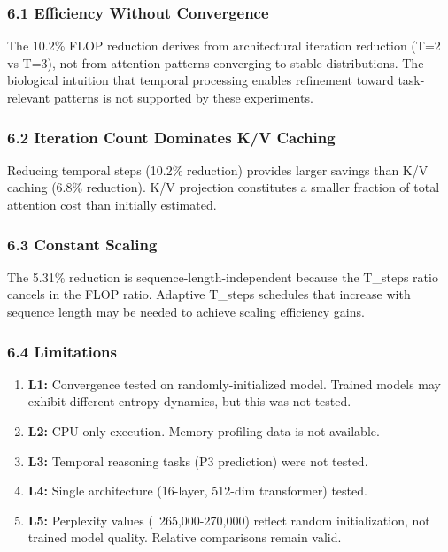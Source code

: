 
\subsubsection{6.1 Efficiency Without Convergence}

The 10.2\% FLOP reduction derives from architectural iteration reduction (T=2 vs T=3), not from attention patterns converging to stable distributions. The biological intuition that temporal processing enables refinement toward task-relevant patterns is not supported by these experiments.

\subsubsection{6.2 Iteration Count Dominates K/V Caching}

Reducing temporal steps (10.2\% reduction) provides larger savings than K/V caching (6.8\% reduction). K/V projection constitutes a smaller fraction of total attention cost than initially estimated.

\subsubsection{6.3 Constant Scaling}

The 5.31\% reduction is sequence-length-independent because the T\_steps ratio cancels in the FLOP ratio. Adaptive T\_steps schedules that increase with sequence length may be needed to achieve scaling efficiency gains.

\subsubsection{6.4 Limitations}

\begin{enumerate}
\item \textbf{L1:} Convergence tested on randomly-initialized model. Trained models may exhibit different entropy dynamics, but this was not tested.
\item \textbf{L2:} CPU-only execution. Memory profiling data is not available.
\item \textbf{L3:} Temporal reasoning tasks (P3 prediction) were not tested.
\item \textbf{L4:} Single architecture (16-layer, 512-dim transformer) tested.
\item \textbf{L5:} Perplexity values (~265,000-270,000) reflect random initialization, not trained model quality. Relative comparisons remain valid.
\end{enumerate}

